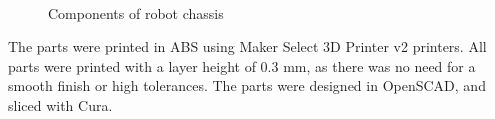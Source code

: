 \documentclass[]{article}
\begin{document}
\begin{figure}
  \centering
  \\
  \caption{Components of robot chassis}
  \label{fig:robotchassis}
\end{figure}

The parts were printed in ABS using Maker Select 3D Printer v2 printers.
All parts were printed with a layer height of 0.3 mm, as there was no need for a smooth finish or high tolerances.
The parts were designed in OpenSCAD, and sliced with Cura.
\end{document}
